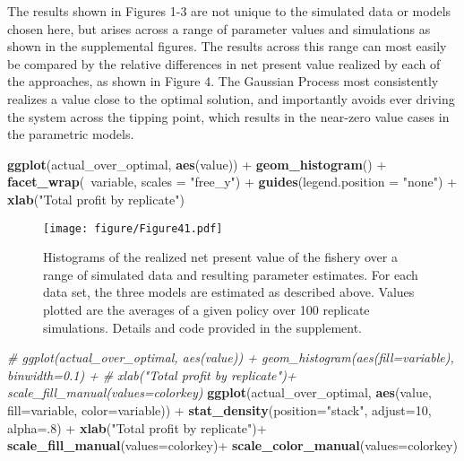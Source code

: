 \documentclass[author-year, review]{elsarticle} %
\makeatletter
\newenvironment{Shaded}{}{}
\newcommand{\KeywordTok}[1]{\textcolor[rgb]{0.00,0.44,0.13}{\textbf{{#1}}}}
\newcommand{\DataTypeTok}[1]{\textcolor[rgb]{0.56,0.13,0.00}{{#1}}}
\newcommand{\DecValTok}[1]{\textcolor[rgb]{0.25,0.63,0.44}{{#1}}}
\newcommand{\StringTok}[1]{\textcolor[rgb]{0.25,0.44,0.63}{{#1}}}
\newcommand{\CommentTok}[1]{\textcolor[rgb]{0.38,0.63,0.69}{\textit{{#1}}}}
\newcommand{\NormalTok}[1]{{#1}}
\def\maxwidth{\ifdim\Gin@nat@width>\linewidth\linewidth
\else\Gin@nat@width\fi}
\let\Oldincludegraphics\includegraphics
\renewcommand{\includegraphics}[1]{\Oldincludegraphics[width=\maxwidth]{#1}}
\makeatother
\begin{document}
The results shown in Figures 1-3 are not unique to the simulated data or
models chosen here, but arises across a range of parameter values and
simulations as shown in the supplemental figures. The results across
this range can most easily be compared by the relative differences in
net present value realized by each of the approaches, as shown in Figure
4. The Gaussian Process most consistently realizes a value close to the
optimal solution, and importantly avoids ever driving the system across
the tipping point, which results in the near-zero value cases in the
parametric models.

\begin{Shaded}
\begin{Highlighting}[]
\KeywordTok{ggplot}\NormalTok{(actual_over_optimal, }\KeywordTok{aes}\NormalTok{(value)) + }\KeywordTok{geom_histogram}\NormalTok{() + }
  \KeywordTok{facet_wrap}\NormalTok{(~variable, }\DataTypeTok{scales =} \StringTok{"free_y"}\NormalTok{) + }\KeywordTok{guides}\NormalTok{(}\DataTypeTok{legend.position =} \StringTok{"none"}\NormalTok{) + }\KeywordTok{xlab}\NormalTok{(}\StringTok{"Total profit by replicate"}\NormalTok{)}
\end{Highlighting}
\end{Shaded}

\begin{figure}[htbp]
\centering
\texttt{[image: figure/Figure41.pdf]}
\caption{Histograms of the realized net present value of the fishery
over a range of simulated data and resulting parameter estimates. For
each data set, the three models are estimated as described above. Values
plotted are the averages of a given policy over 100 replicate
simulations. Details and code provided in the supplement.}
\end{figure}

\begin{Shaded}
\begin{Highlighting}[]
\CommentTok{# ggplot(actual_over_optimal, aes(value)) + geom_histogram(aes(fill=variable), binwidth=0.1) + }
\CommentTok{#  xlab("Total profit by replicate")+ scale_fill_manual(values=colorkey)}
\KeywordTok{ggplot}\NormalTok{(actual_over_optimal, }\KeywordTok{aes}\NormalTok{(value, }\DataTypeTok{fill=}\NormalTok{variable, }\DataTypeTok{color=}\NormalTok{variable)) + }
  \KeywordTok{stat_density}\NormalTok{(}\DataTypeTok{position=}\StringTok{"stack"}\NormalTok{, }\DataTypeTok{adjust=}\DecValTok{10}\NormalTok{, }\DataTypeTok{alpha=}\NormalTok{.}\DecValTok{8}\NormalTok{) + }
  \KeywordTok{xlab}\NormalTok{(}\StringTok{"Total profit by replicate"}\NormalTok{)+ }\KeywordTok{scale_fill_manual}\NormalTok{(}\DataTypeTok{values=}\NormalTok{colorkey)+ }\KeywordTok{scale_color_manual}\NormalTok{(}\DataTypeTok{values=}\NormalTok{colorkey)}
\end{Highlighting}
\end{Shaded}
\end{document}
